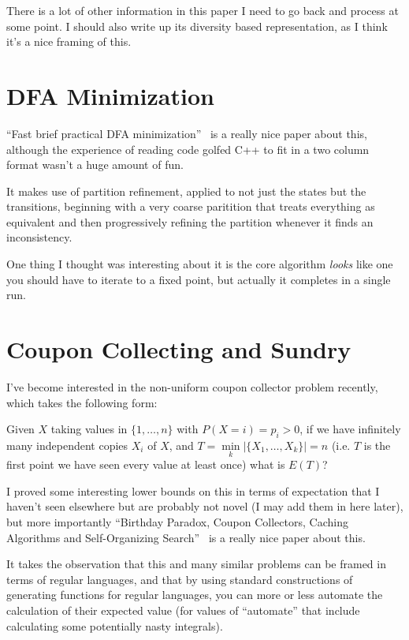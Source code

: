 There is a lot of other information in this paper I need to go back and process at some point.
I should also write up its diversity based representation,
as I think it's a nice framing of this.

\section{DFA Minimization}

``Fast brief practical DFA minimization''~\cite{DBLP:journals/ipl/Valmari12} is a really nice paper about this,
although the experience of reading code golfed C++ to fit in a two column format wasn't a huge amount of fun.

It makes use of partition refinement,
applied to not just the states but the transitions,
beginning with a very coarse paritition that treats everything as equivalent and then progressively refining the partition whenever it finds an inconsistency.

One thing I thought was interesting about it is the core algorithm \emph{looks} like one you should have to iterate to a fixed point,
but actually it completes in a single run.

\section{Coupon Collecting and Sundry}\label{sec:coupons}

I've become interested in the non-uniform coupon collector problem recently,
which takes the following form:

Given \(X\) taking values in \(\{1, \ldots, n\}\) with \(P(X = i) = p_i > 0\),
if we have infinitely many independent copies \(X_i\) of \(X\),
and \(T = \min\limits_k |\{X_1, \ldots, X_k\}| = n\) (i.e. \(T\) is the first point we have seen every value at least once)
what is \(E(T)\)?

I proved some interesting lower bounds on this in terms of expectation that I haven't seen elsewhere but are probably not novel (I may add them in here later),
but more importantly ``Birthday Paradox, Coupon Collectors, Caching Algorithms and Self-Organizing Search''~\cite{DBLP:journals/dam/FlajoletGT92} is a really nice paper about this.

It takes the observation that this and many similar problems can be framed in terms of regular languages,
and that by using standard constructions of generating functions for regular languages,
you can more or less automate the calculation of their expected value (for values of ``automate'' that include calculating some potentially nasty integrals).

